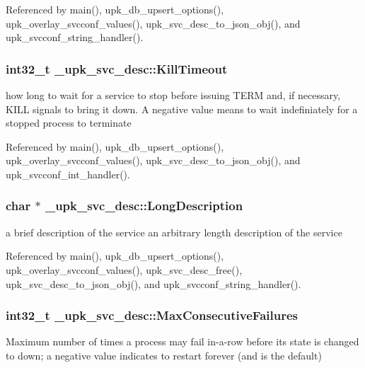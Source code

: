 Referenced by main(), upk\_\-db\_\-upsert\_\-options(), upk\_\-overlay\_\-svcconf\_\-values(), upk\_\-svc\_\-desc\_\-to\_\-json\_\-obj(), and upk\_\-svcconf\_\-string\_\-handler().

\subsubsection[{KillTimeout}]{\setlength{\rightskip}{0pt plus 5cm}int32\_\-t {\bf \_\-upk\_\-svc\_\-desc::KillTimeout}}\label{struct__upk__svc__desc_ad1af978bc37d07566232e0d48427a7cb}
how long to wait for a service to stop before issuing TERM and, if necessary, KILL signals to bring it down. A negative value means to wait indefiniately for a stopped process to terminate 

Referenced by main(), upk\_\-db\_\-upsert\_\-options(), upk\_\-overlay\_\-svcconf\_\-values(), upk\_\-svc\_\-desc\_\-to\_\-json\_\-obj(), and upk\_\-svcconf\_\-int\_\-handler().

\subsubsection[{LongDescription}]{\setlength{\rightskip}{0pt plus 5cm}char $\ast$ {\bf \_\-upk\_\-svc\_\-desc::LongDescription}}\label{struct__upk__svc__desc_ae9bc3da5c1ea58b417a088b9523b04c7}
a brief description of the service an arbitrary length description of the service 

Referenced by main(), upk\_\-db\_\-upsert\_\-options(), upk\_\-overlay\_\-svcconf\_\-values(), upk\_\-svc\_\-desc\_\-free(), upk\_\-svc\_\-desc\_\-to\_\-json\_\-obj(), and upk\_\-svcconf\_\-string\_\-handler().

\subsubsection[{MaxConsecutiveFailures}]{\setlength{\rightskip}{0pt plus 5cm}int32\_\-t {\bf \_\-upk\_\-svc\_\-desc::MaxConsecutiveFailures}}\label{struct__upk__svc__desc_aed98c59b98a6d65c435f7482fdcf7f48}
Maximum number of times a process may fail in-\/a-\/row before its state is changed to down; a negative value indicates to restart forever (and is the default) 

